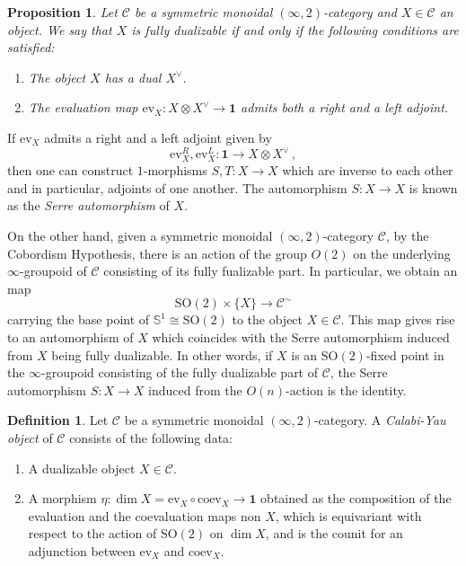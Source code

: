 \documentclass[a4paper,11pt]{article}
\newcommand{\ccal}{\mathcal{C}}
\theoremstyle{plain}
\newtheorem{prop}[thm]{Proposition}
\theoremstyle{definition}
\newtheorem{defi}[thm]{Definition}
\theoremstyle{remark}
\begin{document}
\begin{prop}
Let $\ccal$ be a symmetric monoidal $(\infty, 2)$-category and $X \in \ccal$ an object. We say that $X$ is \textit{fully dualizable} if and only if the following conditions are satisfied: 
\begin{enumerate}[label = \arabic*)]
    \item The object $X$ has a dual $X^{\lor}$.
    \item The evaluation map $\text{ev}_X \colon X \otimes X^{\lor} \to \mathbf{1}$ admits both a right and a left adjoint. 
\end{enumerate}
\end{prop}


If $\text{ev}_X$ admits a right and a left adjoint given by 
$$\text{ev}_X^R, \text{ev}_X^L \colon \mathbf{1} \to X \otimes X^{\lor} \, ,$$
then one can construct $1$-morphisms $S, T \colon X \to X$ which are inverse to each other and in particular, adjoints of one another. The automorphism $S \colon X \to X$ is known as the \textit{Serre automorphism} of $X$.

On the other hand, given a symmetric monoidal $(\infty, 2)$-category $\ccal$, by the Cobordism Hypothesis, there is an action of the group $O(2)$ on the underlying $\infty$-groupoid of $\ccal$ consisting of its fully fualizable part. In particular, we obtain an map 
$$\text{SO}(2) \times \{X\} \to \ccal^{\sim}$$
carrying the base point of $\mathbb{S}^1 \cong \text{SO}(2)$ to the object $X \in \ccal$. This map gives rise to an automorphism of $X$ which coincides with the Serre automorphism induced from $X$ being fully dualizable. In other words, if $X$ is an $\text{SO}(2)$-fixed point in the $\infty$-groupoid consisting of the fully dualizable part of $\ccal$, the Serre automorphism $S \colon X \to X$ induced from the $O(n)$-action is the identity. 


\begin{defi}
Let $\ccal$ be a symmetric monoidal $(\infty, 2)$-category. A \textit{Calabi-Yau object} of $\ccal$ consists of the following data:
\begin{enumerate}[label = \arabic*)]
    \item A dualizable object $X \in \ccal$. 
    \item A morphism $\eta \colon \dim X = \text{ev}_X \circ \text{coev}_X \to \mathbf{1}$ obtained as the composition of the evaluation and the coevaluation maps non $X$, which is equivariant with respect to the action of $\text{SO}(2)$ on $\dim X$, and is the counit for an adjunction between $\text{ev}_X$ and $\text{coev}_X$. 
\end{enumerate}
\end{defi}
\end{document}

